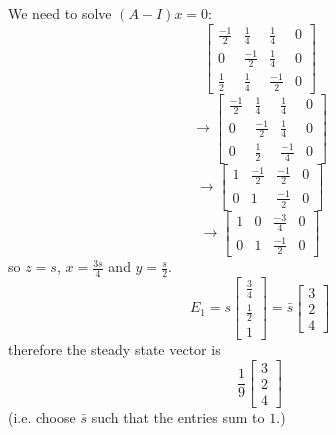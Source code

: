 \documentclass{article}
\begin{document}
\begin{Answer}
We need to solve $(A-I)x = 0$:
  \begin{equation*}
  \left[
  \begin{array}{ccc|c}
  \frac{-1}{2} & \frac{1}{4} & \frac{1}{4}&0\\
  0 & \frac{-1}{2} & \frac{1}{4}&0\\
  \frac{1}{2} & \frac{1}{4} & \frac{-1}{2}&0
  \end{array}
  \right]
  \end{equation*}
  \begin{equation*}
  \rightarrow\left[
  \begin{array}{ccc|c}
  \frac{-1}{2} & \frac{1}{4} & \frac{1}{4}&0\\
  0 & \frac{-1}{2} & \frac{1}{4}&0\\
  0 & \frac{1}{2} & \frac{-1}{4}&0
  \end{array}
  \right]
  \end{equation*}
  \begin{equation*}
  \rightarrow\left[
  \begin{array}{ccc|c}
  1 & \frac{-1}{2} & \frac{-1}{2}&0\\
  0 & 1 & \frac{-1}{2}&0
  \end{array}
  \right]
  \end{equation*}
  \begin{equation*}
  \rightarrow\left[
  \begin{array}{ccc|c}
  1 & 0 & \frac{-3}{4}&0\\
  0 & 1 & \frac{-1}{2}&0
  \end{array}
  \right]
  \end{equation*}
  so $z = s$, $x = \frac{3s}{4}$ and $y = \frac{s}{2}$.
  \begin{equation*}
  E_1 = s \left[
  \begin{array}{c}
  \frac{3}{4}\\
  \frac{1}{2}\\
  1
  \end{array}
  \right] = \bar{s} \left[
  \begin{array}{c}
  3\\
  2\\
  4
  \end{array}
  \right]
  \end{equation*}
  therefore the steady state vector is
  \begin{equation*}
  \frac{1}{9} \left[
  \begin{array}{c}
  3\\
  2\\
  4
  \end{array}
  \right]
  \end{equation*}
  (i.e. choose $\bar{s}$ such that the entries sum to $1$.)
\end{Answer}
\end{document}
